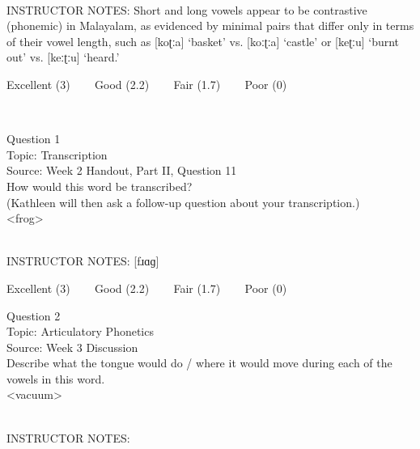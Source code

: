 \documentclass[12pt]{article}
\begin{document}
~\\
INSTRUCTOR NOTES: Short and long vowels appear to be contrastive (phonemic) in Malayalam, as evidenced by minimal pairs that differ only in terms of their vowel length, such as [koʈːa] ‘basket’ vs. [koːʈːa] ‘castle’ or [keʈːu] ‘burnt out’ vs. [keːʈːu] ‘heard.’


\vfill
Excellent (3) ~~~ Good (2.2) ~~~ Fair (1.7) ~~~ Poor (0)
\newpage

\begin{center}
\textbf{{\color{red}{\HUGE END OF EXAM}}}\\

\end{center}
\newpage

\begin{center}
\textbf{{\color{blue}{\HUGE START OF EXAM\\}}}

\textbf{{\color{blue}{\HUGE Student ID: 92054\\}}}

\textbf{{\color{blue}{\HUGE \\}}}

\end{center}
\newpage

{\large Question 1}\\

Topic: Transcription\\
Source: Week 2 Handout, Part II, Question 11\\

How would this word be transcribed?\\ (Kathleen will then ask a follow-up question about your transcription.)\\

<frog>


~\\
INSTRUCTOR NOTES: [fɹɑɡ]


\vfill
Excellent (3) ~~~ Good (2.2) ~~~ Fair (1.7) ~~~ Poor (0)
\newpage

{\large Question 2}\\

Topic: Articulatory Phonetics\\
Source: Week 3 Discussion\\

Describe what the tongue would do / where it would move during each of the vowels in this word.\\

<vacuum>


~\\
INSTRUCTOR NOTES: 
\end{document}
